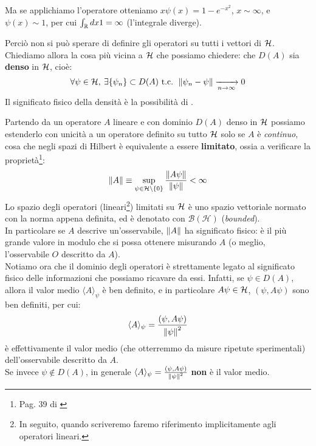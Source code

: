 \documentclass[FisicaTeorica.tex]{subfiles}
\begin{document}
\begin{enumerate}
\begin{es}
	Ma se applichiamo l'operatore otteniamo $x\psi \left(x\right)=1-e^{-x^2}$, $x\sim \infty$, e $\psi \left(x\right)\sim 1$, per cui $\int_{\mathbb{R}} dx 1=\infty$ (l'integrale diverge).
	\end{es}
	Perciò non si può sperare di definire gli operatori su tutti i vettori di $\mathcal{H}$.\\
	Chiediamo allora la cosa più vicina a $\mathcal{H}$ che possiamo chiedere: che $D\left(A\right)$ sia \textbf{denso} in $\mathcal{H}$, cioè:
	\[
	\forall \psi \in \mathcal{H},\> \exists \{\psi_n\} \subset D(A) \text{ t.c. } \left\lVert\psi_n -\psi\right\rVert \xrightarrow[n\to\infty]{} 0
	\]
	Il significato fisico della densità è la possibilità di .\\
\end{enumerate}
Partendo da un operatore $A$ lineare e con dominio $D(A)$ denso in $\mathcal{H}$ possiamo estenderlo con unicità a un operatore definito su tutto $\mathcal{H}$ solo se $A$ è \textit{continuo}, cosa che negli spazi di Hilbert è equivalente a essere \textbf{limitato}, ossia a verificare la proprietà\footnote{Pag. 39 di \cite{spazi_hilbert}}:
	\[
	\left\lVert A\right\rVert \equiv \sup_{\psi \in \mathcal{H} \setminus \{0\}} \frac{\left\lVert A\psi\right\rVert}{\left\lVert\psi\right\rVert} < \infty
	\]
	Lo spazio degli operatori (lineari\footnote{In seguito, quando scriveremo  faremo riferimento implicitamente agli operatori lineari.}) limitati su $\mathcal{H}$ è uno spazio vettoriale normato con la norma appena definita, ed è denotato con $\mathcal{B}\left(\mathcal{H}\right)$ (\textit{bounded}).\\
	In particolare se $A$ descrive un'osservabile, $\left\lVert A\right\rVert$ ha significato fisico: è il più grande valore in modulo che si possa ottenere misurando $A$ (o meglio, l'osservabile $O$ descritto da $A$).\\
	Notiamo ora che il dominio degli operatori è strettamente legato al significato fisico delle informazioni che possiamo ricavare da essi.
	Infatti, se $\psi \in D(A)$, allora il valor medio $\langle A\rangle_\psi$ è ben definito, e in particolare $A\psi\in \mathcal{H}$, $(\psi, A\psi)$ sono ben definiti, per cui: 
	\[
	\langle A \rangle_\psi = \frac{(\psi,A\psi)}{\left\lVert\psi\right\rVert^2}
	\]
	è effettivamente il valor medio (che otterremmo da misure ripetute sperimentali) dell'osservabile descritto da $A$.\\
	Se invece $\psi \notin D(A)$, in generale $\langle A\rangle_\psi = \frac{(\psi, A\psi)}{\left\lVert\psi\right\rVert^2}$ \textbf{non} è il valor medio.\\
\end{document}
